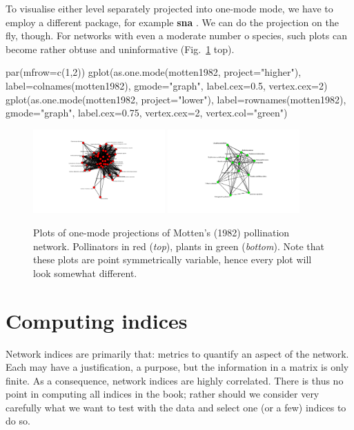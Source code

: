 \documentclass[a4paper, 11pt]{article}\usepackage[]{graphicx}\usepackage[]{color}
\newcommand{\package}[1]{\textbf{#1}}
\begin{document}
%
To visualise either level separately projected into one-mode mode, we have to employ a different package, for example \package{sna} \citep{Butts2013}. We can do the projection on the fly, though. For networks with even a moderate number o species, such plots can become rather obtuse and uninformative (Fig.~\ref{fig:Amottengplot} top).
\begin{Schunk}
\begin{Sinput}
par(mfrow=c(1,2))
gplot(as.one.mode(motten1982, project="higher"), 
 label=colnames(motten1982), gmode="graph", 
label.cex=0.5, vertex.cex=2)
gplot(as.one.mode(motten1982, project="lower"), 
	label=rownames(motten1982), gmode="graph", 
	label.cex=0.75, vertex.cex=2, vertex.col="green")
\end{Sinput}
\end{Schunk}
\begin{figure}
\centering
	\includegraphics[width=0.45\textwidth]{figures/motten1982_higher_gplot}
	\hfill
	\includegraphics[width=0.45\textwidth]{figures/motten1982_lower_gplot}
	\caption{Plots of one-mode projections of Motten's (1982) pollination network. Pollinators in red (\emph{top}), plants in green (\emph{bottom}). Note that these plots are point symmetrically variable, hence every plot will look somewhat different.}
	\label{fig:Amottengplot}
\end{figure}


\clearpage

\section{Computing indices} %
Network indices are primarily that: metrics to quantify an aspect of the network. Each may have a justification, a purpose, but the information in a matrix is only finite. As a consequence, network indices are highly correlated. There is thus no point in computing all indices in the book; rather should we consider very carefully what we want to test with the data and select one (or a few) indices to do so.
\end{document}

